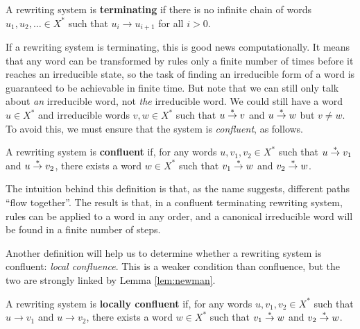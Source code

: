 \begin{definition}
  \label{def:terminating}
  A rewriting system is \textbf{terminating} if there is no infinite chain of
  words $u_1, u_2, \ldots \in X^*$ such that $u_i \to u_{i+1}$ for all $i > 0$.
\end{definition}

If a rewriting system is terminating, this is good news computationally.  It
means that any word can be transformed by rules only a finite number of times
before it reaches an irreducible state, so the task of finding an irreducible
form of a word is guaranteed to be achievable in finite time.  But note that we
can still only talk about \textit{an} irreducible word, not \textit{the}
irreducible word.  We could still have a word $u \in X^*$ and irreducible words
$v, w \in X^*$ such that $u \stackrel{*}{\to} v$ and $u \stackrel{*}{\to} w$ but $v \neq w$.
To avoid this, we must ensure that the system is \textit{confluent}, as follows.

\begin{definition}
  \label{def:confluent}
  A rewriting system is \textbf{confluent} if, for any words $u,v_1,v_2 \in X^*$
  such that $u \stackrel{*}{\to} v_1$ and $u \stackrel{*}{\to} v_2$, there exists a word $w \in X^*$
  such that $v_1 \stackrel{*}{\to} w$ and $v_2 \stackrel{*}{\to} w$.
\end{definition}

The intuition behind this definition is that, as the name suggests, different
paths ``flow together''.  The result is that, in a confluent terminating
rewriting system, rules can be applied to a word in any order, and a canonical
irreducible word will be found in a finite number of steps.

Another definition will help us to determine whether a rewriting system is
confluent: \textit{local confluence}.  This is a weaker condition than
confluence, but the two are strongly linked by Lemma \ref{lem:newman}.

\begin{definition}
  \label{def:locally-confluent}
  A rewriting system is \textbf{locally confluent} if, for any words
  $u,v_1,v_2 \in X^*$ such that $u \to v_1$ and $u \to v_2$, there exists a word
  $w \in X^*$ such that $v_1 \stackrel{*}{\to} w$ and $v_2 \stackrel{*}{\to} w$.
\end{definition}

